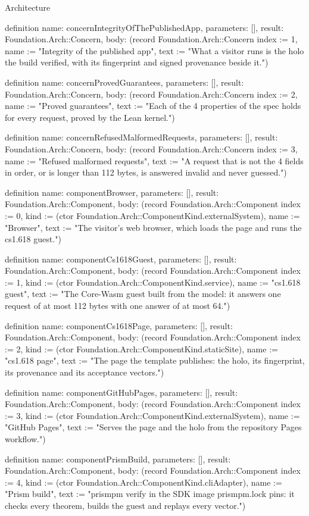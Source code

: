 \begin{lexlean}{Architecture}
\begin{semanticmodule}
definition{
  name: concernIntegrityOfThePublishedApp,
  parameters: [],
  result: Foundation.Arch::Concern,
  body: (record Foundation.Arch::Concern {index := 1, name := "Integrity of the published app", text := "What a visitor runs is the holo the build verified, with its fingerprint and signed provenance beside it."})
}

definition{
  name: concernProvedGuarantees,
  parameters: [],
  result: Foundation.Arch::Concern,
  body: (record Foundation.Arch::Concern {index := 2, name := "Proved guarantees", text := "Each of the 4 properties of the spec holds for every request, proved by the Lean kernel."})
}

definition{
  name: concernRefusedMalformedRequests,
  parameters: [],
  result: Foundation.Arch::Concern,
  body: (record Foundation.Arch::Concern {index := 3, name := "Refused malformed requests", text := "A request that is not the 4 fields in order, or is longer than 112 bytes, is answered invalid and never guessed."})
}

definition{
  name: componentBrowser,
  parameters: [],
  result: Foundation.Arch::Component,
  body: (record Foundation.Arch::Component {index := 0, kind := (ctor Foundation.Arch::ComponentKind.externalSystem), name := "Browser", text := "The visitor's web browser, which loads the page and runs the cs1.618 guest."})
}

definition{
  name: componentCs1618Guest,
  parameters: [],
  result: Foundation.Arch::Component,
  body: (record Foundation.Arch::Component {index := 1, kind := (ctor Foundation.Arch::ComponentKind.service), name := "cs1.618 guest", text := "The Core-Wasm guest built from the model: it answers one request of at most 112 bytes with one answer of at most 64."})
}

definition{
  name: componentCs1618Page,
  parameters: [],
  result: Foundation.Arch::Component,
  body: (record Foundation.Arch::Component {index := 2, kind := (ctor Foundation.Arch::ComponentKind.staticSite), name := "cs1.618 page", text := "The page the template publishes: the holo, its fingerprint, its provenance and its acceptance vectors."})
}

definition{
  name: componentGitHubPages,
  parameters: [],
  result: Foundation.Arch::Component,
  body: (record Foundation.Arch::Component {index := 3, kind := (ctor Foundation.Arch::ComponentKind.externalSystem), name := "GitHub Pages", text := "Serves the page and the holo from the repository Pages workflow."})
}

definition{
  name: componentPrismBuild,
  parameters: [],
  result: Foundation.Arch::Component,
  body: (record Foundation.Arch::Component {index := 4, kind := (ctor Foundation.Arch::ComponentKind.cliAdapter), name := "Prism build", text := "prismpm verify in the SDK image prismpm.lock pins: it checks every theorem, builds the guest and replays every vector."})
}


\end{semanticmodule}
\end{lexlean}
